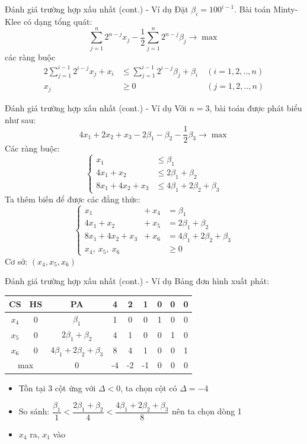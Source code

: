 \documentclass[10pt]{beamer}
\begin{document}
\begin{frame}{Đánh giá trường hợp xấu nhất (cont.) - Ví dụ}
Đặt $\beta_i = 100^{i - 1}$. Bài toán Minty-Klee có dạng tổng quát:
$$
\sum_{j = 1}^n 2^{n - j}x_j - \frac{1}{2}\sum_{j = 1}^n 2^{n - j}\beta_j \rightarrow \max
$$
các ràng buộc
$$
\begin{aligned}
2\sum_{j = 1}^{i - 1} 2^{i - j}x_j + x_i &\leq \sum_{j = 1}^{i - 1}2^{i - j}\beta_j + \beta_i\ &(i = 1, 2, .., n)\\
x_j &\geq 0 &(j = 1, 2, .., n)
\end{aligned}
$$
\end{frame}

\begin{frame}{Đánh giá trường hợp xấu nhất (cont.) - Ví dụ}
Với $n = 3$, bài toán được phát biểu như sau:
$$
4x_1 + 2x_2 + x_3 - 2\beta_1 - \beta_2 - \frac{1}{2}\beta_3 \rightarrow \max
$$
Các ràng buộc:
$$
\left\{
\begin{array}{lll}
x_1 &\leq \beta_1\\
4x_1 + x_2 &\leq 2\beta_1 + \beta_2\\
8x_1 + 4x_2 + x_3 &\leq 4\beta_1 + 2\beta_2 + \beta_3
\end{array}
\right.
$$
Ta thêm biến để được các đẳng thức:
$$
\left\{
\begin{array}{lll}
x_1 & + \ x_4 & = \beta_1\\
4x_1 + x_2 & + \ x_5 & = 2\beta_1 + \beta_2\\
8x_1 + 4x_2 + x_3 & + \ x_6 & = 4\beta_1 + 2\beta_2 + \beta_3\\
x_4, \ x_5, \ x_6 & &\geq 0
\end{array}
\right.
$$
Cơ sở: $(x_4, x_5, x_6)$
\end{frame}

\begin{frame}{Đánh giá trường hợp xấu nhất (cont.) - Ví dụ}
Bảng đơn hình xuất phát:
\begin{table}[H]
\centering
\begin{tabular}{|c|c|c|c|c|c|c|c|c|}
\hline
CS & HS & PA & 4 & 2 & 1 & 0 & 0 & 0 \\
\hline
$x_4$ & 0 & $\beta_1$ & 1 & 0 & 0 & 1 & 0 & 0 \\
$x_5$ & 0 & $2\beta_1 + \beta_2$ & 4 & 1 & 0 & 0 & 1 & 0 \\
$x_6$ & 0 & $4\beta_1 + 2\beta_2 + \beta_3$ & 8 & 4 & 1 & 0 & 0 & 1 \\
\hline
\multicolumn{2}{|c|}{max}
& 0 & -4 & -2 & -1 & 0 & 0 & 0 \\
\hline
\end{tabular}
\end{table}
\begin{itemize}
\item Tồn tại 3 cột ứng với $\Delta < 0$, ta chọn cột có $\Delta = -4$  
\item So sánh: $\dfrac{\beta_1}{1} < \dfrac{2\beta_1 + \beta_2}{4} < \dfrac{4\beta_1 + 2\beta_2 + \beta_3}{8}$ nên ta chọn dòng 1  
\item $x_4$ ra, $x_1$ vào
\end{itemize}
\end{frame}
\end{document}
